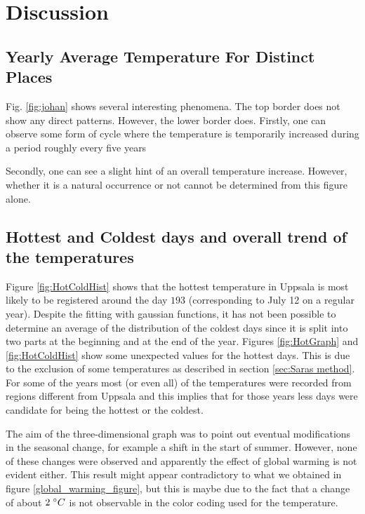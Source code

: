 \documentclass[a4paper]{article}
\begin{document}
\section{Discussion}\label{sec:Discussion}

\subsection{Yearly Average Temperature For Distinct Places}

Fig. \ref{fig:johan} shows several interesting phenomena.
The top border does not show any direct patterns. However, the lower border does. Firstly, one can observe some form of cycle where the temperature is temporarily increased during a period roughly every five years

Secondly, one can see a slight hint of an overall temperature increase. However, whether it is a natural occurrence or not cannot be determined from this figure alone.

\subsection{Hottest and Coldest days and overall trend of the temperatures}
Figure \ref{fig:HotColdHist} shows that the hottest temperature in Uppsala is most likely to be registered around the day $193$ (corresponding to July 12 on a regular year). 
Despite the fitting with gaussian functions, it has not been possible to determine an average of the distribution of the coldest days since it is split into two parts at the beginning and at the end of the year. Figures \ref{fig:HotGraph} and \ref{fig:HotColdHist} 
show some unexpected values for the hottest days. This is due to the exclusion of some temperatures as described in section
\ref{sec:Saras method}. For some of the years most (or even all) of the temperatures were recorded from regions
different from Uppsala and this implies that for those years less days were candidate for being the hottest or the coldest. 

The aim of the three-dimensional graph was to point out eventual modifications in the seasonal change, for example a shift in the start of summer. However, none of these changes were observed and apparently the effect of global warming is not evident either. This result might appear contradictory to what we obtained in figure \ref{global_warming_figure}, but this is maybe due to the fact that a change of about $2 \hspace{1mm} ^\circ C$ is not observable in the color coding used for the temperature.
\end{document}
